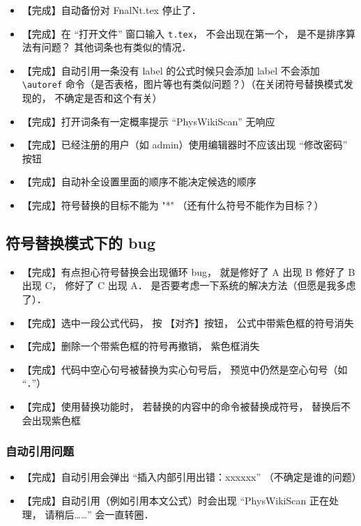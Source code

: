\begin{itemize}
\item 【完成】自动备份对 FnalNt.tex 停止了．

\item 【完成】在 “打开文件” 窗口输入 \lstinline|t.tex|， 不会出现在第一个， 是不是排序算法有问题？ 其他词条也有类似的情况．

\item 【完成】自动引用一条没有 label 的公式时候只会添加 label 不会添加 \lstinline|\autoref| 命令（是否表格，图片等也有类似问题？）（在关闭符号替换模式发现的， 不确定是否和这个有关）

\item 【完成】打开词条有一定概率提示 “PhysWikiScan” 无响应

\item 【完成】已经注册的用户（如 admin）使用编辑器时不应该出现 “修改密码” 按钮

\item 【完成】自动补全设置里面的顺序不能决定候选的顺序

\item 【完成】符号替换的目标不能为 "*" （还有什么符号不能作为目标？）
\end{itemize}

\subsection{符号替换模式下的 bug}
\begin{itemize}
\item 【完成】有点担心符号替换会出现循环 bug， 就是修好了 A 出现 B 修好了 B 出现 C， 修好了 C 出现 A． 是否要考虑一下系统的解决方法（但愿是我多虑了）．

\item 【完成】选中一段公式代码， 按 【对齐】按钮， 公式中带紫色框的符号消失

\item 【完成】删除一个带紫色框的符号再撤销， 紫色框消失

\item 【完成】代码中空心句号被替换为实心句号后， 预览中仍然是空心句号（如 “．”）

\item 【完成】使用替换功能时， 若替换的内容中的命令被替换成符号， 替换后不会出现紫色框
\end{itemize}

\subsubsection{自动引用问题}
\begin{itemize}
\item 【完成】自动引用会弹出 “插入内部引用出错：xxxxxx” （不确定是谁的问题）
\item 【完成】自动引用（例如引用本文公式）时会出现 “PhysWikiScan 正在处理， 请稍后……” 会一直转圈．
\end{itemize}

